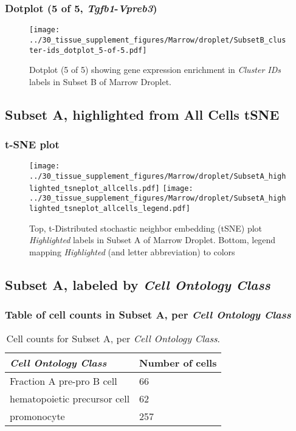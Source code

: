 \clearpage

\subsubsection{Dotplot (5 of 5, \emph{Tgfb1}-\emph{Vpreb3})}
\begin{figure}[h]
\centering
\texttt{[image: ../30\_tissue\_supplement\_figures/Marrow/droplet/SubsetB\_cluster-ids\_dotplot\_5-of-5.pdf]}

\caption{ Dotplot (5 of 5)  showing gene expression enrichment in \emph{Cluster IDs} labels in Subset B of Marrow Droplet. }
\end{figure}


\clearpage
\subsection{Subset A, highlighted from All Cells tSNE}
\subsubsection{t-SNE plot}
\begin{figure}[h]
\centering
\texttt{[image: ../30\_tissue\_supplement\_figures/Marrow/droplet/SubsetA\_highlighted\_tsneplot\_allcells.pdf]}
\texttt{[image: ../30\_tissue\_supplement\_figures/Marrow/droplet/SubsetA\_highlighted\_tsneplot\_allcells\_legend.pdf]}
\caption{Top, t-Distributed stochastic neighbor embedding (tSNE) plot  \emph{Highlighted} labels in Subset A of Marrow Droplet. Bottom, legend mapping \emph{Highlighted} (and letter abbreviation) to colors}
\end{figure}


\clearpage

\subsection{Subset A, labeled by \emph{Cell Ontology Class}}
\subsubsection{Table of cell counts in Subset A, per \emph{Cell Ontology Class}}\begin{table}[h]
\centering
\label{my-label}
\begin{tabular}{@{}ll@{}}
\toprule

\emph{Cell Ontology Class}& Number of cells \\ \midrule
Fraction A pre-pro B cell & 66 \\

hematopoietic precursor cell & 62 \\

promonocyte & 257 \\
\bottomrule
\end{tabular}
\caption{Cell counts for Subset A, per \emph{Cell Ontology Class}.}
\end{table}

